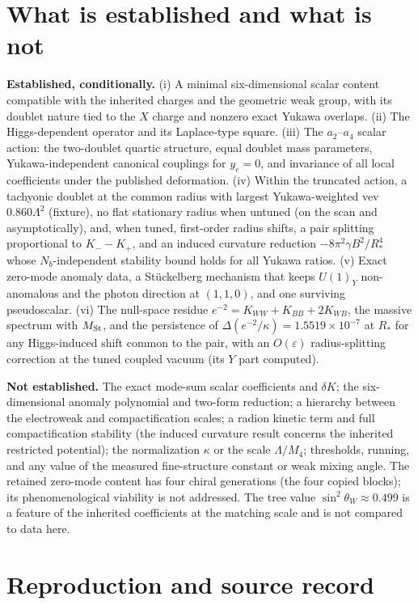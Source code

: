 \documentclass[11pt,letterpaper]{article}
\newcommand{\Lam}{\Lambda}
\begin{document}
\section{What is established and what is not}

\textbf{Established, conditionally.} (i) A minimal six-dimensional scalar content compatible with the inherited charges and the geometric weak group, with its doublet nature tied to the $X$ charge and nonzero exact Yukawa overlaps. (ii) The Higgs-dependent operator and its Laplace-type square. (iii) The $a_2$--$a_4$ scalar action: the two-doublet quartic structure, equal doublet mass parameters, Yukawa-independent canonical couplings for $y_e=0$, and invariance of all local coefficients under the published deformation. (iv) Within the truncated action, a tachyonic doublet at the common radius with largest Yukawa-weighted vev $0.860\Lam^2$ (fixture), no flat stationary radius when untuned (on the scan and asymptotically), and, when tuned, first-order radius shifts, a pair splitting proportional to $K_--K_+$, and an induced curvature reduction $-8\pi^2\gamma B^2/R_*^4$ whose $N_b$-independent stability bound holds for all Yukawa ratios. (v) Exact zero-mode anomaly data, a Stückelberg mechanism that keeps $U(1)_Y$ non-anomalous and the photon direction at $(1,1,0)$, and one surviving pseudoscalar. (vi) The null-space residue $e^{-2}=K_{WW}+K_{BB}+2K_{WB}$, the massive spectrum with $M_{\rm St}$, and the persistence of $\Delta(e^{-2}/\kappa)=1.5519\times10^{-7}$ at $R_*$ for any Higgs-induced shift common to the pair, with an $O(\varepsilon)$ radius-splitting correction at the tuned coupled vacuum (its $Y$ part computed).

\textbf{Not established.} The exact mode-sum scalar coefficients and $\delta K$; the six-dimensional anomaly polynomial and two-form reduction; a hierarchy between the electroweak and compactification scales; a radion kinetic term and full compactification stability (the induced curvature result concerns the inherited restricted potential); the normalization $\kappa$ or the scale $\Lam/M_4$; thresholds, running, and any value of the measured fine-structure constant or weak mixing angle. The retained zero-mode content has four chiral generations (the four copied blocks); its phenomenological viability is not addressed. The tree value $\sin^2\theta_W\approx0.499$ is a feature of the inherited coefficients at the matching scale and is not compared to data here.

\section{Reproduction and source record}
\end{document}
